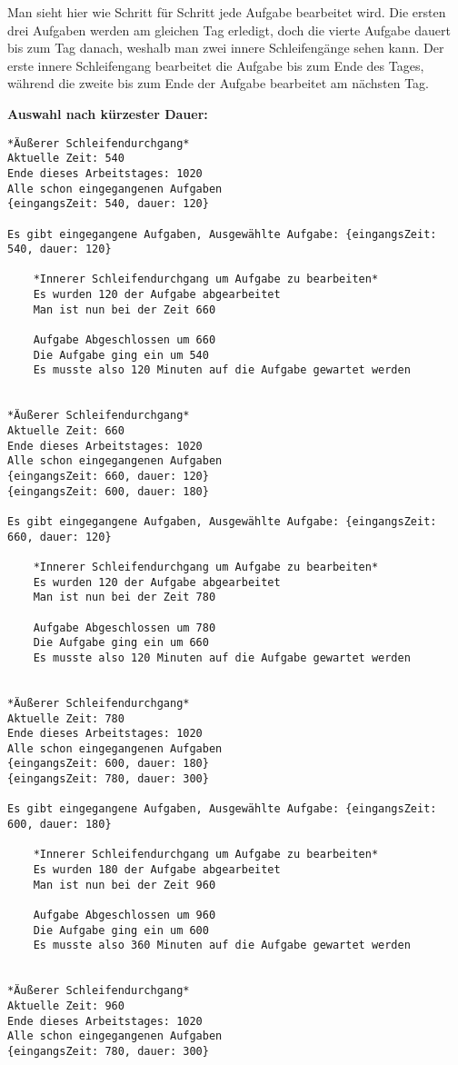 \documentclass[a4paper,10pt,ngerman]{scrartcl}
\begin{document}
Man sieht hier wie Schritt für Schritt jede Aufgabe bearbeitet wird.
Die ersten drei Aufgaben werden am gleichen Tag erledigt,
doch die vierte Aufgabe dauert bis zum Tag danach,
weshalb man zwei innere Schleifengänge sehen kann.
Der erste innere Schleifengang bearbeitet die Aufgabe bis zum Ende des Tages,
während die zweite bis zum Ende der Aufgabe bearbeitet am nächsten Tag.

\textbf{ Auswahl nach kürzester Dauer:}
\begin{lstlisting}[numbers=none]
*Äußerer Schleifendurchgang*
Aktuelle Zeit: 540
Ende dieses Arbeitstages: 1020
Alle schon eingegangenen Aufgaben
{eingangsZeit: 540, dauer: 120}

Es gibt eingegangene Aufgaben, Ausgewählte Aufgabe: {eingangsZeit: 540, dauer: 120}

    *Innerer Schleifendurchgang um Aufgabe zu bearbeiten*
    Es wurden 120 der Aufgabe abgearbeitet
    Man ist nun bei der Zeit 660

    Aufgabe Abgeschlossen um 660
    Die Aufgabe ging ein um 540
    Es musste also 120 Minuten auf die Aufgabe gewartet werden


*Äußerer Schleifendurchgang*
Aktuelle Zeit: 660
Ende dieses Arbeitstages: 1020
Alle schon eingegangenen Aufgaben
{eingangsZeit: 660, dauer: 120}
{eingangsZeit: 600, dauer: 180}

Es gibt eingegangene Aufgaben, Ausgewählte Aufgabe: {eingangsZeit: 660, dauer: 120}

    *Innerer Schleifendurchgang um Aufgabe zu bearbeiten*
    Es wurden 120 der Aufgabe abgearbeitet
    Man ist nun bei der Zeit 780

    Aufgabe Abgeschlossen um 780
    Die Aufgabe ging ein um 660
    Es musste also 120 Minuten auf die Aufgabe gewartet werden


*Äußerer Schleifendurchgang*
Aktuelle Zeit: 780
Ende dieses Arbeitstages: 1020
Alle schon eingegangenen Aufgaben
{eingangsZeit: 600, dauer: 180}
{eingangsZeit: 780, dauer: 300}

Es gibt eingegangene Aufgaben, Ausgewählte Aufgabe: {eingangsZeit: 600, dauer: 180}

    *Innerer Schleifendurchgang um Aufgabe zu bearbeiten*
    Es wurden 180 der Aufgabe abgearbeitet
    Man ist nun bei der Zeit 960

    Aufgabe Abgeschlossen um 960
    Die Aufgabe ging ein um 600
    Es musste also 360 Minuten auf die Aufgabe gewartet werden


*Äußerer Schleifendurchgang*
Aktuelle Zeit: 960
Ende dieses Arbeitstages: 1020
Alle schon eingegangenen Aufgaben
{eingangsZeit: 780, dauer: 300}


\end{lstlisting}
\end{document}

